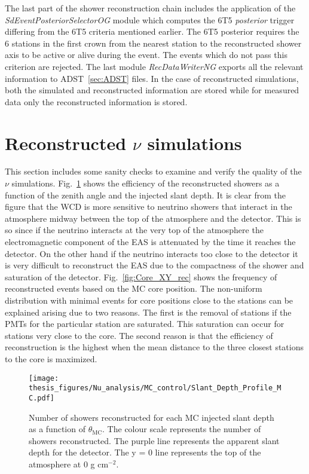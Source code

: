 The last part of the shower reconstruction chain includes the application of the \textit{SdEventPosteriorSelectorOG} module which computes the 6T5 \textit{posterior} trigger differing from the 6T5 criteria mentioned earlier. The 6T5 posterior requires the 6 stations in the first crown from the nearest station to the reconstructed shower axis to be active or alive during the event. The events which do not pass this criterion are rejected. The last module \textit{RecDataWriterNG} exports all the relevant information to ADST~\ref{sec:ADST} files. In the case of reconstructed simulations, both the simulated and reconstructed information are stored while for measured data only the reconstructed information is stored.

\section{Reconstructed \texorpdfstring{$\nu$}{} simulations}
\label{sec:reco_possel}
This section includes some sanity checks to examine and verify the quality of the $\nu$ simulations. Fig.~\ref{fig:Slant_depth_rec} shows the efficiency of the reconstructed showers as a function of the zenith angle and the injected slant depth. It is clear from the figure that the WCD is more sensitive to neutrino showers that interact in the atmosphere midway between the top of the atmosphere and the detector. This is so since if the neutrino interacts at the very top of the atmosphere the electromagnetic component of the EAS is attenuated by the time it reaches the detector. On the other hand if the neutrino interacts too close to the detector it is very difficult to reconstruct the EAS due to the compactness of the shower and saturation of the detector. Fig.~\ref{fig:Core_XY_rec} shows the frequency of reconstructed events based on the MC core position. The non-uniform distribution with minimal events for core positions close to the stations can be explained arising due to two reasons. The first is the removal of stations if the PMTs for the particular station are saturated. This saturation can occur for stations very close to the core. The second reason is that the efficiency of reconstruction is the highest when the mean distance to the three closest stations to the core is maximized.

\begin{figure}[t!]
  \centering
  \texttt{[image: thesis\_figures/Nu\_analysis/MC\_control/Slant\_Depth\_Profile\_MC.pdf]}
  \caption{Number of showers reconstructed for each MC injected slant depth as a function of $\theta_{\text{MC}}$. The colour scale represents the number of showers reconstructed. The purple line represents the apparent slant depth for the detector. The y = 0 line represents the top of the atmosphere at 0 g cm$^{-2}$.}
  \label{fig:Slant_depth_rec}
\end{figure}

